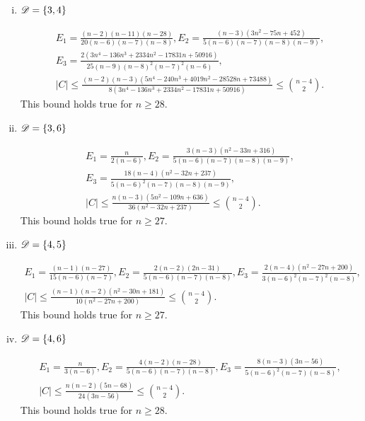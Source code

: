 \documentclass{amsart}
\begin{document}
{\begin{enumerate}[(i)]
\begin{gather*}
E_1=\frac{(n-2)\left(n^2-27 n+172\right)}{5 (n-6) (n-7) (n-8) },E_2=\frac{2(n-4)(n-11)(n-15)}{3(n-6)(n-7)(n-8)(n-9)},\\E_3=\frac{8 (n-12) \left(n^2-27 n+167\right)}{15 (n-6)^2(n-7) (n-8) (n-9) },\\
|C| \leq \frac{(n-2)(n-4)(3n^3-104n^2+1145n-4020)}{8(n-12)(n^2-27n+167)} \leq \binom{n-4}{2}.
\end{gather*}
This bound holds true for $n\ge35.$

\item $ \mathscr{D} = \{3, 4\}$

\begin{gather*}
E_1=\frac{(n-2)(n-11)(n-28)}{20(n-6) (n-7) (n-8)},E_2=\frac{(n-3)\left(3n^2-75n+452\right)}{5 (n-6)(n-7) (n-8)(n-9)},\\E_3=\frac{2 \left(3 n^4-136 n^3+2334 n^2-17831 n+50916\right)}{25 (n-9) (n-8)^2 (n-7)^2 (n-6)},\\
|C| \leq \frac{(n-2)(n-3)(5n^4-240n^3+4019n^2-28528n+73488)}{8(3n^4-136n^3+2334n^2-17831n+50916)} \leq \binom{n-4}{2}.
\end{gather*}
This bound holds true for $n\ge28$.

\item $\mathscr{D} = \{3, 6\}$

\begin{gather*}
E_1=\frac{n}{2(n-6)},E_2=\frac{3(n-3)\left(n^2-33 n+316\right)}{5 (n-6)(n-7)(n-8)(n-9)},\\
E_3=\frac{18 (n-4) \left(n^2-32 n+237\right)}{5(n-6)^2 (n-7) (n-8) (n-9) },\\
|C| \leq \frac{n(n-3)(5n^2-109n+636)}{36(n^2-32n+237)} \leq \binom{n-4}{2}.
\end{gather*}
This bound holds true for $n\ge 27.$

\item $\mathscr{D} = \{4, 5\}$

\begin{gather*}
E_1=\frac{(n-1) (n-27)}{15(n-6) (n-7)},E_2=\frac{2(n-2)(2n-31) }{5 (n-6)(n-7)(n-8)}, E_3=\frac{2 (n-4) \left(n^2-27 n+200\right)}{3 (n-6)^2(n-7)^2(n-8)  },\\
|C| \leq \frac{(n-1)(n-2)(n^2-30n+181)}{10(n^2-27n+200)} \leq \binom{n-4}{2}.
\end{gather*}
This bound holds true for $n\ge27.$

\item $\mathscr{D} = \{4, 6\}$

\begin{gather*}
E_1=\frac{n}{3(n-6)},E_2=\frac{4(n-2)(n-28)}{5 (n-6)(n-7)(n-8)}, E_3=\frac{8 (n-3) (3 n-56)}{5 (n-6)^2(n-7) (n-8) },\\
|C| \leq \frac{n(n-2)(5n-68)}{24(3n-56)} \leq \binom{n-4}{2}.
\end{gather*}
This bound holds true for $n\ge28.$


\end{enumerate}}
\end{document}
